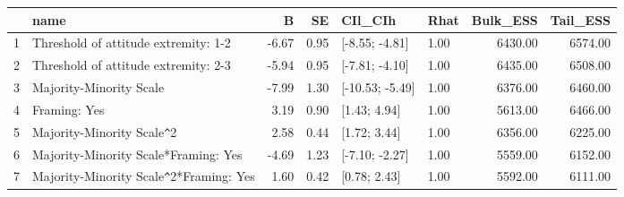 \begin{table}[ht]
\centering
\begin{tabular}{rlrrllrr}
  \toprule
 & name & B & SE & CIl\_CIh & Rhat & Bulk\_ESS & Tail\_ESS \\ 
  \midrule
1 & Threshold of attitude extremity: 1-2 & -6.67 & 0.95 & [-8.55; -4.81] & 1.00 & 6430.00 & 6574.00 \\ 
  2 & Threshold of attitude extremity: 2-3 & -5.94 & 0.95 & [-7.81; -4.10] & 1.00 & 6435.00 & 6508.00 \\ 
  3 & Majority-Minority Scale & -7.99 & 1.30 & [-10.53; -5.49] & 1.00 & 6376.00 & 6460.00 \\ 
  4 & Framing: Yes & 3.19 & 0.90 & [1.43; 4.94] & 1.00 & 5613.00 & 6466.00 \\ 
  5 & Majority-Minority Scale\verb|^|2 & 2.58 & 0.44 & [1.72; 3.44] & 1.00 & 6356.00 & 6225.00 \\ 
  6 & Majority-Minority Scale*Framing: Yes & -4.69 & 1.23 & [-7.10; -2.27] & 1.00 & 5559.00 & 6152.00 \\ 
  7 & Majority-Minority Scale\verb|^|2*Framing: Yes & 1.60 & 0.42 & [0.78; 2.43] & 1.00 & 5592.00 & 6111.00 \\ 
   \bottomrule
\end{tabular}
\end{table}
